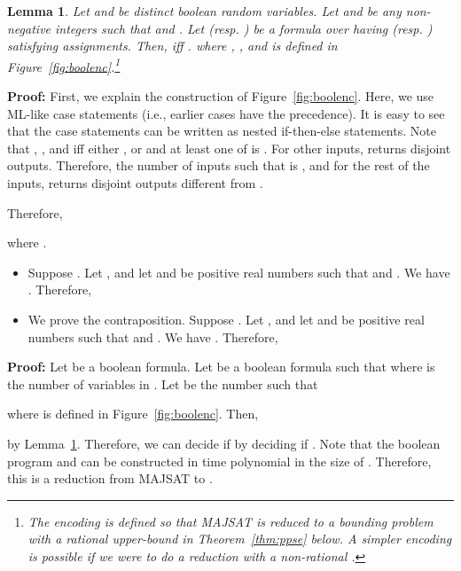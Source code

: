 \documentclass{llncs}
\newtheorem{lemma}[theorem]{Lemma}
\newenvironment{proof}{\noindent\rm{\bf Proof:}}{\hbox{}\vspace*{0.2\baselineskip}}
\newenvironment{reftheorem}[1]{\begin{trivlist}\item[\hskip
      \labelsep{\bf Theorem #1.}]\it}{\end{trivlist}}
\begin{document}
\begin{lemma}
\label{lem:semonotone}
Let  and  be distinct boolean random variables.  Let 
and  be any non-negative integers such that 
and .  Let  (resp. ) be a formula
over  having  (resp. ) satisfying assignments. Then,
 iff .  where , , and  is defined in
Figure~\ref{fig:boolenc}.\footnote{The encoding  is defined so
    that MAJSAT is reduced to a bounding problem with a rational
    upper-bound  in Theorem~\ref{thm:ppse} below.  A simpler
    encoding is possible if we were to do a reduction with a
    non-rational .}
\end{lemma}
\begin{proof}
  First, we explain the construction  of
  Figure~\ref{fig:boolenc}.  Here, we use ML-like case statements
  (i.e., earlier cases have the precedence).  It is easy to see that the case
  statements can be written as nested if-then-else statements. Note
  that , , and  iff either , or  and at least
  one of  is .  For other inputs,
   returns disjoint outputs.  Therefore, the number of inputs
   such that  is , and for the rest of the  inputs,  returns
  disjoint outputs different from .

Therefore, 

where .
\begin{itemize}
\item 

  Suppose .  Let , and let 
  and  be positive real numbers such that
   and .
  We have .  Therefore,


\item 

  We prove the contraposition.  Suppose .  Let
  , and let  and  be positive real numbers such
  that  and
  .  We have .  Therefore,

\end{itemize}
\end{proof}

\begin{reftheorem}{\ref{thm:ppse}}

\end{reftheorem}
\begin{proof}
Let  be a boolean formula.  Let  be a boolean formula such
that  where  is the number of variables in
.  Let  be the number such that

where  is defined in Figure~\ref{fig:boolenc}.
Then,

by Lemma~\ref{lem:semonotone}.  Therefore, we can decide if
 by deciding if .
Note that the boolean program  and  can be
constructed in time polynomial in the size of .  Therefore, this
is a reduction from \textrm{MAJSAT} to .
\end{proof}
\end{document}
